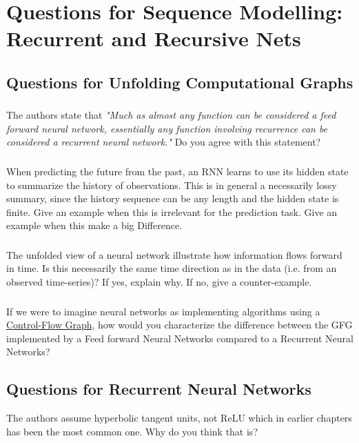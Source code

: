 \documentclass[a4paper]{report} \usepackage{amsmath}
\begin{document}
\chapter{Questions for Sequence Modelling: Recurrent and Recursive Nets}

\section{Questions for Unfolding Computational Graphs}

\subsection{}
The authors state that \textit{"Much as almost any function can be
  considered a feed forward neural network, essentially any function
  involving recurrence can be considered a recurrent neural network."}
Do you agree with this statement?
\subsection{}
When predicting the future from the past, an RNN learns to use its
hidden state to summarize the history of observations. This is in
general a necessarily lossy summary, since the history sequence can be
any length and the hidden state is finite. Give an example when this
is irrelevant for the prediction task. Give an example when this make
a big Difference.
\subsection{}
The unfolded view of a neural network illustrate how information flows
forward in time. Is this necessarily the same time direction as in the
data (i.e. from an observed time-series)? If yes, explain why. If no,
give a counter-example.
\subsection{}
If we were to imagine neural networks as implementing algorithms using
a \href{https://en.wikipedia.org/wiki/Control-flow_graph}{Control-Flow
  Graph}, how would you characterize the difference between the GFG
implemented by a Feed forward Neural Networks compared to a Recurrent
Neural Networks?

\section{Questions for Recurrent Neural Networks}
{} The authors assume hyperbolic tangent units, not ReLU which in
earlier chapters has been the most common one. Why do you think that
is?
\end{document}
